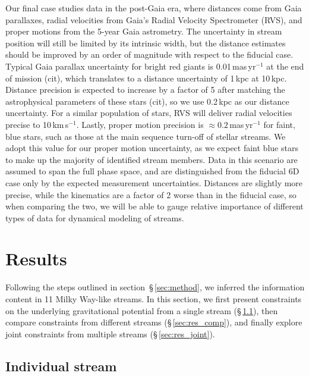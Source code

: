 \documentclass[modern]{aastex61}
\begin{document}
Our final case studies data in the post-Gaia era, where distances come from Gaia parallaxes, radial velocities from Gaia's Radial Velocity Spectrometer (RVS), and proper motions from the 5-year Gaia astrometry.
The uncertainty in stream position will still be limited by its intrinsic width, but the distance estimates should be improved by an order of magnitude with respect to the fiducial case.
Typical Gaia parallax uncertainty for bright red giants is 0.01\,mas\,yr$^{-1}$ at the end of mission (cit), which translates to a distance uncertainty of 1\,kpc at 10\,kpc.
Distance precision is expected to increase by a factor of 5 after matching the astrophysical parameters of these stars (cit), so we use 0.2\,kpc as our distance uncertainty.
For a similar population of stars, RVS will deliver radial velocities precise to 10\,km\,s$^{-1}$.
Lastly, proper motion precision is $\approx0.2$\,mas\,yr$^{-1}$ for faint, blue stars, such as those at the main sequence turn-off of stellar streams.
We adopt this value for our proper motion uncertainty, as we expect faint blue stars to make up the majority of identified stream members.
Data in this scenario are assumed to span the full phase space, and are distinguished from the fiducial 6D case only by the expected measurement uncertainties.
Distances are slightly more precise, while the kinematics are a factor of 2 worse than in the fiducial case, so when comparing the two, we will be able to gauge relative importance of different types of data for dynamical modeling of streams.


\section{Results}
Following the steps outlined in section~\S\,\ref{sec:method}, we inferred the information content in 11 Milky Way-like streams.
In this section, we first present constraints on the underlying gravitational potential from a single stream (\S\,\ref{sec:res_ind}), then compare constraints from different streams (\S\,\ref{sec:res_comp}), and finally explore joint constraints from multiple streams (\S\,\ref{sec:res_joint}).

\subsection{Individual stream}
\label{sec:res_ind}
\end{document}
